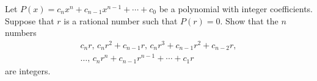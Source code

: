 Let $P(x) = c_n x^n + c_{n-1} x^{n-1} + \cdots + c_0$ be a polynomial with
integer coefficients. Suppose that $r$ is a rational number such that
$P(r) = 0$.  Show that the $n$ numbers
\begin{gather*}
c_n r, \, c_n r^2 + c_{n-1} r, \, c_n r^3 + c_{n-1} r^2 + c_{n-2} r, \\
\dots, \, c_n r^n + c_{n-1} r^{n-1} + \cdots + c_1 r
\end{gather*}
are integers.
